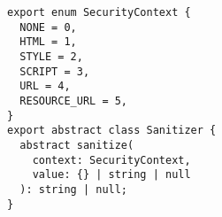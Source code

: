 \begin{verbatim}
export enum SecurityContext {
  NONE = 0,
  HTML = 1,
  STYLE = 2,
  SCRIPT = 3,
  URL = 4,
  RESOURCE_URL = 5,
}
export abstract class Sanitizer {
  abstract sanitize(
    context: SecurityContext,
    value: {} | string | null
  ): string | null;
}
\end{verbatim}
